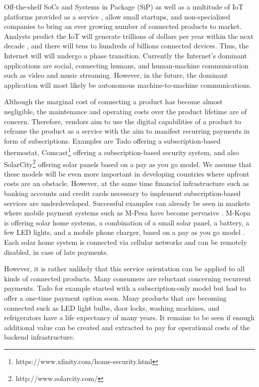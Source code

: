 Off-the-shelf SoCs and Systems in Package (SiP) as well as a multitude of IoT platforms provided as a service \parencite{ISI:000379632700002}, allow small startups, and non-specialized companies to bring an ever growing number of connected products to market. Analysts predict the IoT will generate trillions of dollars per year within the next decade \parencite{manyika2015unlocking}, and there will tens to hundreds of billions connected devices. Thus, the Internet will will undergo a phase transition. Currently the Internet's dominant applications are social, connecting humans, and human-machine communication such as video and music streaming. However, in the future, the dominant application will most likely be autonomous machine-to-machine communications. 

Although the marginal cost of connecting a product has become almost negligible, the maintenance and operating costs over the product lifetime are of concern. Therefore, vendors aim to use the digital capabilities of a product to reframe the product as a service with the aim to manifest recurring payments in form of subscriptions. Examples are Tado offering a subscription-based thermostat, Comcast\footnote{https://www.xfinity.com/home-security.html} offering a subscription-based security system, and also SolarCity\footnote{http://www.solarcity.com/} offering solar panels based on a pay as you go model. We assume that these models will be even more important in developing countries where upfront costs are an obstacle. However, at the same time financial infrastructure such as banking accounts and credit cards necessary to implement subscription-based services are underdeveloped. Successful examples can already be seen in markets where mobile payment systems such as M-Pesa have become pervasive \parencite{hughes2007m}. M-Kopa is offering solar home systems, a combination of a small solar panel, a battery, a few LED lights, and a mobile phone charger, based on a pay as you go model \parencite{ISI:000351842100012}. Each solar home system is connected via cellular networks and can be remotely disabled, in case of late payments. 

However, it is rather unlikely that this service orientation can be applied to all kinds of connected products. Many consumers  are reluctant concerning recurrent payments. Tado for example started with a subscription-only model but had to offer a one-time payment option soon. Many products that are becoming connected such as LED light bulbs, door locks, washing machines, and refrigerators have a life expectancy of many years. It remains to be seen if enough additional value can be created and extracted to pay for operational costs of the backend infrastructure.

